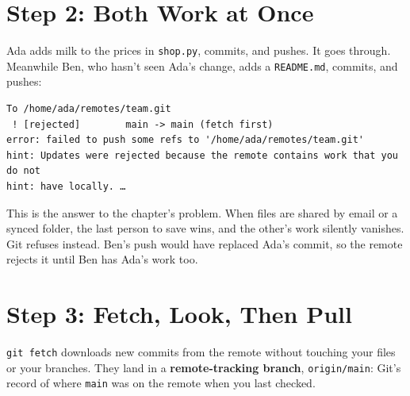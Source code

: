 
\section{Step 2: Both Work at Once}\label{11-lab-work-on-a-project-with-someone-else:step-2-both-work-at-once}

Ada adds milk to the prices in \texttt{shop.py}, commits, and pushes. It goes through. Meanwhile Ben, who hasn't seen Ada's change, adds a \texttt{README.md}, commits, and pushes:

\begin{codeblock}

\begin{Shaded}
\begin{Highlighting}[]
\end{Highlighting}
\end{Shaded}

\end{codeblock}

\begin{codeblock}
\begin{Verbatim}[formatcom=\outputstyle]
To /home/ada/remotes/team.git
 ! [rejected]        main -> main (fetch first)
error: failed to push some refs to '/home/ada/remotes/team.git'
hint: Updates were rejected because the remote contains work that you do not
hint: have locally. …
\end{Verbatim}
\end{codeblock}

This is the answer to the chapter's problem. When files are shared by email or a synced folder, the last person to save wins, and the other's work silently vanishes. Git refuses instead. Ben's push would have replaced Ada's commit, so the remote rejects it until Ben has Ada's work too.

\section{Step 3: Fetch, Look, Then Pull}\label{11-lab-work-on-a-project-with-someone-else:step-3-fetch-look-then-pull}

\texttt{git\ fetch} downloads new commits from the remote without touching your files or your branches. They land in a \textbf{remote-tracking branch}, \texttt{origin/main}: Git's record of where \texttt{main} was on the remote when you last checked.

